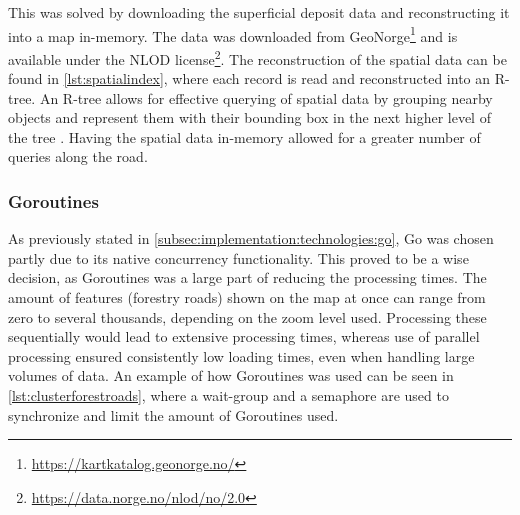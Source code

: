 This was solved by downloading the superficial deposit data and reconstructing it into a map in-memory. The data was downloaded from GeoNorge\footnote{\url{https://kartkatalog.geonorge.no/}} and is available under the NLOD license\footnote{\url{https://data.norge.no/nlod/no/2.0}}. The reconstruction of the spatial data can be found in \autoref{lst:spatialindex}, where each record is read and reconstructed into an R-tree. An R-tree allows for effective querying of spatial data by grouping nearby objects and represent them with their bounding box in the next higher level of the tree \cite{rtreewikipedia}. Having the spatial data in-memory allowed for a greater number of queries along the road.

\begin{figure}[h]

\end{figure}

\subsubsection{Goroutines}

As previously stated in \autoref{subsec:implementation:technologies:go}, Go was chosen partly due to its native concurrency functionality. This proved to be a wise decision, as Goroutines was a large part of reducing the processing times. The amount of features (forestry roads) shown on the map at once can range from zero to several thousands, depending on the zoom level used. Processing these sequentially would lead to extensive processing times, whereas use of parallel processing ensured consistently low loading times, even when handling large volumes of data. An example of how Goroutines was used can be seen in \autoref{lst:clusterforestroads}, where a wait-group and a semaphore are used to synchronize and limit the amount of Goroutines used.
